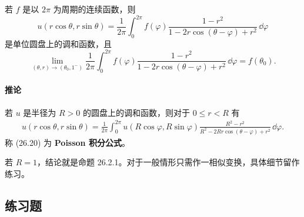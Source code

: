 \begin{xproposition}[26.2.1]
若 $f$ 是以 $2\pi$ 为周期的连续函数，则
\[
  u(r\cos\theta,r\sin\theta)
  =\frac{1}{2\pi}\int_0^{2\pi}f(\varphi)
  \frac{1-r^2}{1-2r\cos(\theta-\varphi)+r^2}\,\dd\varphi
\]
是单位圆盘上的调和函数，且
\[
  \lim_{(\theta,r)\to(\theta_0,1^-)}\frac{1}{2\pi}\int_0^{2\pi}f(\varphi)
  \frac{1-r^2}{1-2r\cos(\theta-\varphi)+r^2}\,\dd\varphi=f(\theta_0).
\]
\end{xproposition}

\paragraph{推论}
若 $u$ 是半径为 $R>0$ 的圆盘上的调和函数，则对于 $0\le r<R$ 有
\begin{equation}
  \begin{aligned}
  u(r\cos\theta,r\sin\theta)
  =\frac{1}{2\pi}\int_0^{2\pi}u(R\cos\varphi,R\sin\varphi)
  \frac{R^2-r^2}{R^2-2Rr\cos(\theta-\varphi)+r^2}\,\dd\varphi.
  \end{aligned}
  \tag{26.20}
  \label{eq:26.20}
\end{equation}
称 (26.20) 为 \textbf{Poisson 积分公式}。

\begin{xproof}
若 $R=1$，结论就是命题 26.2.1。对于一般情形只需作一相似变换，具体细节留作练习。
\end{xproof}

\subsection{练习题}

